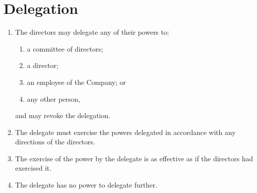 \section{Delegation}

\begin{enumerate}[label=(\alph*)]
    \item The directors may delegate any of their powers to:
    \begin{enumerate}[label=(\roman*)]
        \item a committee of directors;
        \item a director;
        \item an employee of the Company; or
        \item any other person,
    \end{enumerate}
    
    and may revoke the delegation.
    
    \item The delegate must exercise the powers delegated in accordance with any directions of the directors.
    
    \item The exercise of the power by the delegate is as effective as if the directors had exercised it.
    
    \item The delegate has no power to delegate further.
\end{enumerate} 